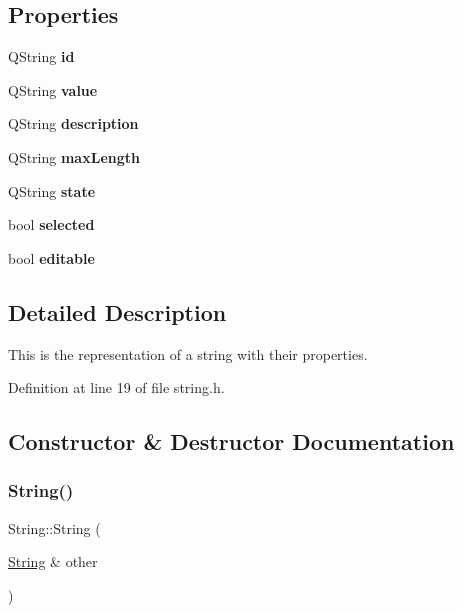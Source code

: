 \subsection*{Properties}
\begin{DoxyCompactItemize}
\item 
\mbox{\label{classString_a82cd6049ff79198e7d24ed97b7a6c4c3}} 
Q\+String {\bfseries id}
\item 
\mbox{\label{classString_a08d78cc301801cdac26795f3070fab9c}} 
Q\+String {\bfseries value}
\item 
\mbox{\label{classString_aa3d3e472e670f550eb5f9e26aeee81d6}} 
Q\+String {\bfseries description}
\item 
\mbox{\label{classString_a7a711e734960d3e721a6439d96289ce2}} 
Q\+String {\bfseries max\+Length}
\item 
\mbox{\label{classString_ab4d9446f69355dc0c9bdd3ecda847679}} 
Q\+String {\bfseries state}
\item 
\mbox{\label{classString_aa80dde9547a7d229060f9bb094ee28f1}} 
bool {\bfseries selected}
\item 
\mbox{\label{classString_a11a02211f65634f17ea47cb8b1a272ed}} 
bool {\bfseries editable}
\end{DoxyCompactItemize}


\subsection{Detailed Description}
This is the representation of a string with their properties. 

Definition at line 19 of file string.\+h.



\subsection{Constructor \& Destructor Documentation}
\mbox{\label{classString_addd6bcc4ba529bdc45d3fd69ad1a3569}} 
\subsubsection{\texorpdfstring{String()}{String()}\hspace{0.1cm}{\footnotesize\ttfamily [1/2]}}
{\footnotesize\ttfamily String\+::\+String (\begin{DoxyParamCaption}\item[{\mbox{\hyperlink{classString}{String}} \&}]{other }\end{DoxyParamCaption})}



